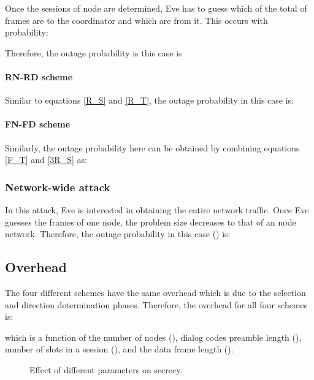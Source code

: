 \documentclass[10pt,letterpaper,conference]{IEEEtran}
\begin{document}
Once the sessions of node  are determined, Eve has to guess which of the total of 
frames are to the coordinator and which are from it. This occurs with
probability:



Therefore, the outage probability is this case is


\paragraph{\textbf{RN-RD scheme}}

Similar to equations \ref{R_S} and \ref{R_T}, the outage probability in this
case is:



\paragraph{\textbf{FN-FD scheme}}

Similarly, the outage probability here can be obtained by combining equations
\ref{F_T} and \ref{3R_S} as:



\subsubsection{Network-wide attack}
In this attack, Eve is interested in obtaining the entire network traffic. Once
Eve guesses the frames of one node, the problem size decreases to that of an 
node network. Therefore, the outage probability in this case
() is:



\subsection{Overhead}
The four different schemes have the same overhead which is due to the selection
and direction determination phases. Therefore, the overhead for all four schemes is:



which is a function of the number of nodes (), dialog codes preamble length (), number of slots in a session
(), and the data frame length ().

\begin{figure*}[!t]
\centering
{}
\caption{Effect of different parameters on secrecy.}
\label{fig:secrecy}
\end{figure*}
\end{document}
